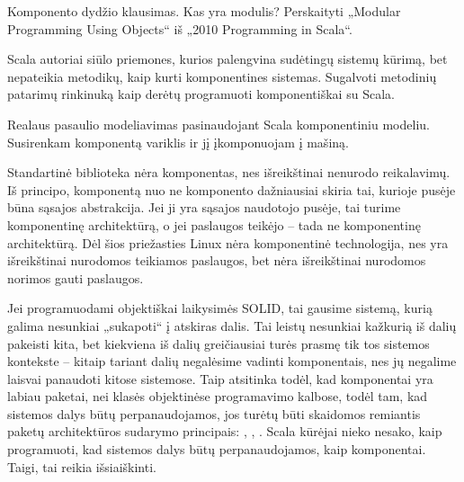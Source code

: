 Komponento dydžio klausimas. Kas yra modulis? Perskaityti „Modular
Programming Using Objects“ iš „2010 Programming in Scala“.

Scala autoriai siūlo priemones, kurios palengvina sudėtingų sistemų
kūrimą, bet nepateikia metodikų, kaip kurti komponentines sistemas.
Sugalvoti metodinių patarimų rinkinuką kaip derėtų programuoti
komponentiškai su Scala.

Realaus pasaulio modeliavimas pasinaudojant Scala komponentiniu
modeliu. Susirenkam komponentą variklis ir jį įkomponuojam į
mašiną.

Standartinė biblioteka nėra komponentas, nes išreikštinai nenurodo
reikalavimų. Iš principo, komponentą nuo ne komponento dažniausiai
skiria tai, kurioje pusėje būna sąsajos abstrakcija. Jei ji yra
sąsajos naudotojo pusėje, tai turime komponentinę architektūrą, o
jei paslaugos teikėjo – tada ne komponentinę architektūrą. Dėl šios
priežasties Linux nėra komponentinė technologija, nes yra
išreikštinai nurodomos teikiamos paslaugos, bet nėra išreikštinai
nurodomos norimos gauti paslaugos.

Jei programuodami objektiškai laikysimės SOLID, tai gausime sistemą,
kurią galima nesunkiai „sukapoti“ į atskiras dalis. Tai leistų
nesunkiai kažkurią iš dalių pakeisti kita, bet kiekviena iš dalių
greičiausiai turės prasmę tik tos sistemos kontekste – kitaip
tariant dalių negalėsime vadinti komponentais, nes jų negalime
laisvai panaudoti kitose sistemose. Taip atsitinka todėl, kad
komponentai yra labiau paketai, nei klasės objektinėse programavimo
kalbose, todėl tam, kad sistemos dalys būtų perpanaudojamos, jos
turėtų būti skaidomos remiantis paketų architektūros sudarymo
principais: ,
, 
\cite[17]{design-principles-and-design-patterns}.
Scala kūrėjai nieko nesako, kaip programuoti, kad sistemos
dalys būtų perpanaudojamos, kaip komponentai. Taigi, tai reikia
išsiaiškinti.
